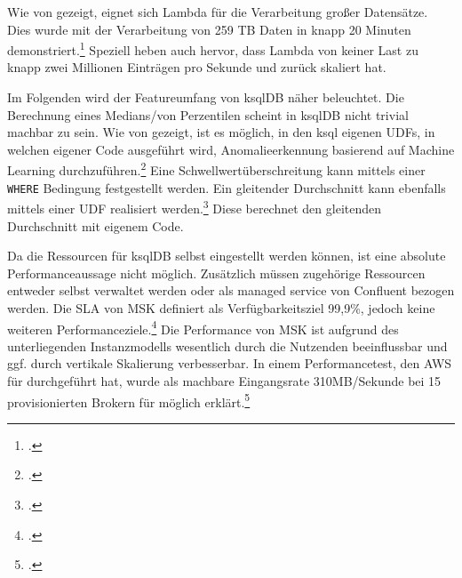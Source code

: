Wie von \citeauthor{Madden.2019} gezeigt, eignet sich Lambda für die Verarbeitung großer Datensätze. 
Dies wurde mit der Verarbeitung von 259 TB Daten in knapp 20 Minuten demonstriert.\footcite[Vgl. auch im Folgenden][]{Madden.2019} Speziell heben \citeauthor{Madden.2019} auch hervor, dass Lambda von keiner Last zu knapp zwei Millionen Einträgen pro Sekunde und zurück skaliert hat.





Im Folgenden wird der Featureumfang von ksqlDB näher beleuchtet.
Die Berechnung eines Medians/von Perzentilen scheint in ksqlDB nicht trivial machbar zu sein.
Wie von \citeauthor{Waehner.2018} gezeigt, ist es möglich, in den ksql eigenen \acp{UDF}, in welchen eigener Code ausgeführt wird, Anomalieerkennung basierend auf Machine Learning durchzuführen.\footcite[Vgl.][]{Waehner.2018}
Eine Schwellwertüberschreitung kann mittels einer \texttt{WHERE} Bedingung festgestellt werden.
Ein gleitender Durchschnitt kann ebenfalls mittels einer \ac{UDF} realisiert werden.\footcite[Vgl.][]{ConfluentInc..o.J.c} 
Diese berechnet den gleitenden Durchschnitt mit eigenem Code.

Da die Ressourcen für ksqlDB selbst eingestellt werden können, ist eine absolute Performanceaussage nicht möglich. Zusätzlich müssen zugehörige Ressourcen entweder selbst verwaltet werden oder als managed service von Confluent bezogen werden.
Die \ac{SLA} von \ac{MSK} definiert als Verfügbarkeitsziel 99,9\%, jedoch keine weiteren Performanceziele.\footcite[Vgl.][]{AmazonWebServicesInc..2019e} 
Die Performance von \ac{MSK} ist aufgrund des unterliegenden Instanzmodells wesentlich durch die Nutzenden beeinflussbar und ggf. durch vertikale Skalierung verbesserbar.
In einem Performancetest, den \ac{AWS} für \citeauthor{Statz.2019} durchgeführt hat, wurde als machbare Eingangsrate 310MB/Sekunde bei 15 provisionierten Brokern für möglich erklärt.\footcite[Vgl.][]{Statz.2019} 